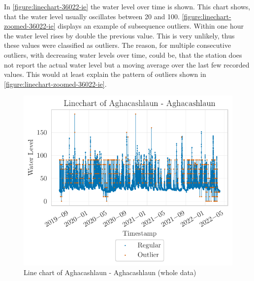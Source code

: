 In \autoref{figure:linechart-36022-ie} the water level over time is shown. This chart shows, that the water level usually oscillates between 20 and 100. \autoref{figure:linechart-zoomed-36022-ie} displays an example of subsequence outliers. Within one hour the water level rises by double the previous value. This is very unlikely, thus these values were classified as outliers. The reason, for  multiple consecutive outliers, with decreasing water levels over time, could be, that the station does not report the actual water level but a moving average over the last few recorded values. This would at least explain the pattern of outliers shown in \autoref{figure:linechart-zoomed-36022-ie}.
\begin{figure}[htp]
    \centering
    \includegraphics{./plots/pdfs/36022-ie/linechart_36022-ie.pdf}
    \caption{Line chart of Aghacashlaun - Aghacashlaun (whole data)}
    \label{figure:linechart-36022-ie}
\end{figure}

